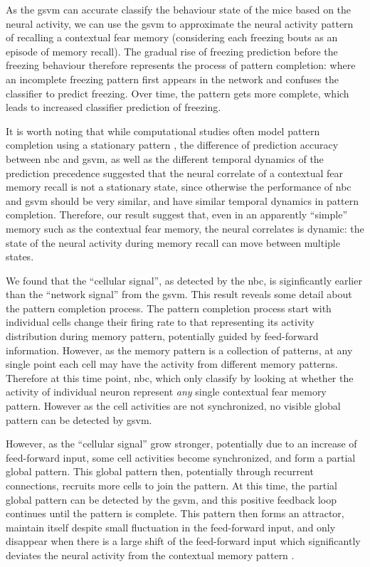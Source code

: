 As the \gls{gsvm} can accurate classify the behaviour state of the mice based on the neural activity, we can use the \gls{gsvm} to approximate the neural activity pattern of recalling a contextual fear memory (considering each freezing bouts as an episode of memory recall). The gradual rise of freezing prediction before the freezing behaviour therefore represents the process of pattern completion: where an incomplete freezing pattern first appears in the network and confuses the classifier to predict freezing. Over time, the pattern gets more complete, which leads to increased classifier prediction of freezing. 

It is worth noting that while computational studies often model pattern completion using a stationary pattern \citep{rolls13}, the difference of prediction accuracy between \gls{nbc} and \gls{gsvm}, as well as the different temporal dynamics of the prediction precedence suggested that the neural correlate of a contextual fear memory recall is not a stationary state, since otherwise the performance of \gls{nbc} and \gls{gsvm} should be very similar, and have similar temporal dynamics in pattern completion. Therefore, our result suggest that, even in an apparently ``simple'' memory such as the contextual fear memory, the neural correlates is dynamic: the state of the neural activity during memory recall can move between multiple states.

We found that the ``cellular signal'', as detected by the \gls{nbc}, is siginficantly earlier than the ``network signal'' from the \gls{gsvm}. This result reveals some detail about the pattern completion process. The pattern completion process start with individual cells change their firing rate to that representing its activity distribution during memory pattern, potentially guided by feed-forward information. However, as the memory pattern is a collection of patterns, at any single point each cell may have the activity from different memory patterns. Therefore at this time point, \gls{nbc}, which only classify by looking at whether the activity of individual neuron represent \textit{any} single contextual fear memory pattern. However as the cell activities are not synchronized, no visible global pattern can be detected by \gls{gsvm}. 

However, as the ``cellular signal'' grow stronger, potentially due to an increase of feed-forward input, some cell activities become synchronized, and form a partial global pattern. This global pattern then, potentially through recurrent connections, recruits more cells to join the pattern. At this time, the partial global pattern can be detected by the \gls{gsvm}, and this positive feedback loop continues until the pattern is complete. This pattern then forms an attractor, maintain itself despite small fluctuation in the feed-forward input, and only disappear when there is a large shift of the feed-forward input which significantly deviates the neural activity from the contextual memory pattern \citep{rolls13}. 

